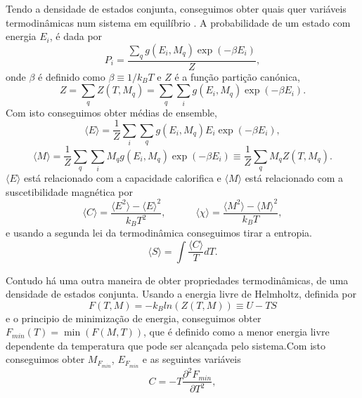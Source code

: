 \documentclass[12pt, a4paper]{article}
\begin{document}
	Tendo a densidade de estados conjunta, conseguimos obter quais quer variáveis termodinâmicas num sistema em equilíbrio \cite{stat_mech_book}.  
	A probabilidade de um estado com energia $E_i$, é dada por
\begin{equation}
	P_i = \frac{\sum_q g(E_i, M_q) \exp(-\beta E_i)}{Z},
\end{equation}
onde $\beta$ é definido como $\beta \equiv 1/k_BT$ e $Z$ é a função partição canónica, 
\begin{equation}
	Z = \sum_q Z(T, M_q) = \sum_q \sum_i g(E_i, M_q) \exp(-\beta E_i).
\end{equation}
Com isto conseguimos obter médias de ensemble, 
\begin{equation}
	\langle E \rangle = \frac{1}{Z} \sum_i \sum_q  g(E_i, M_q) E_i \exp(-\beta E_i),
\end{equation}
\begin{equation}
	\langle M \rangle  = \frac{1}{Z} \sum_q \sum_i M_q g(E_i, M_q) \exp(-\beta E_i) \equiv \frac{1}{Z} \sum_q M_q Z(T, M_q).
\end{equation}
$\langle E \rangle$ está relacionado com a capacidade calorifica e $\langle M \rangle$ está relacionado com a suscetibilidade magnética por 
\begin{equation}\label{C_mean}
	\langle C \rangle = \frac{\langle E^2 \rangle - \langle E \rangle^2}{ k_B T^2}, \quad \quad \quad 
	\langle \chi \rangle = \frac{\langle M^2 \rangle - \langle M \rangle^2}{k_B T},
\end{equation}
e usando a segunda lei da termodinâmica conseguimos tirar a entropia.
\begin{equation}\label{S_mean}
	\langle S \rangle= \int \frac{\langle C \rangle}{T} dT.
\end{equation}

	Contudo há uma outra maneira de obter propriedades termodinâmicas, de uma densidade de estados conjunta. Usando a energia livre de Helmholtz, definida por 
\begin{equation}\label{Helm}
	F(T, M) = - k_B ln(Z(T, M)) \equiv U - TS
\end{equation}
e o principio de minimização de energia, conseguimos obter $F_{min} (T) = \min(F(M, T))$, que é definido como a menor energia livre dependente da temperatura que pode ser alcançada pelo sistema.Com isto conseguimos obter $M_{F_{min}}$, $E_{F_{min}}$ e as seguintes variáveis
\begin{equation}\label{C_dev}
	C = - T \frac{\partial^2 F_{min}}{\partial T^2},
\end{equation}
\end{document}
